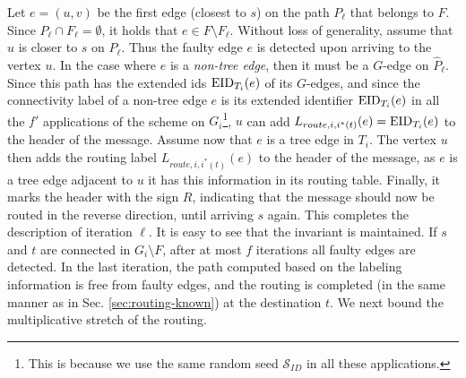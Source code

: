 Let $e=(u,v)$ be the first edge (closest to $s$) on the path $P_\ell$ that belongs to $F$. Since $P_\ell \cap F_\ell=\emptyset$, it holds that $e \in F \setminus F_\ell$. Without loss of generality, assume that $u$ is closer to $s$ on $P_\ell$. Thus the faulty edge $e$ is detected upon arriving to the vertex $u$. 
In the case where $e$ is a \emph{non-tree edge}, then it must be a $G$-edge on $\widehat{P}_\ell$. Since this path has the extended ids $\operatorname{EID}_{T_i}(e)$ of its $G$-edges, and since the connectivity label of a non-tree edge $e$ is its extended identifier $\operatorname{EID}_{T_i}(e)$ in all the $f'$ applications of the scheme on $G_i$\footnote{This is because we use the same random seed $\mathcal{S}_{ID}$ in all these applications.}, $u$ can add $L_{route,i,i^*(t)}(e)=\operatorname{EID}_{T_i}(e)$ to the header of the message. Assume now that $e$ is a tree edge in $T_i$. The vertex $u$ then adds the routing label $L_{route,i,i^*(t)}(e)$ to the header of the message, as $e$ is a tree edge adjacent to $u$ it has this information in its routing table. Finally, it marks the header with the sign $R$, indicating that the message should now be routed in the reverse direction, until arriving $s$ again. This completes the description of iteration $\ell$. It is easy to see that the invariant is maintained. If $s$ and $t$ are connected in $G_i \setminus F$, after at most $f$ iterations all faulty edges are detected. In the last iteration, the path computed based on the labeling information is free from faulty edges, and the routing is completed (in the same manner as in Sec. \ref{sec:routing-known}) at the destination $t$. We next bound the multiplicative stretch of the routing.


